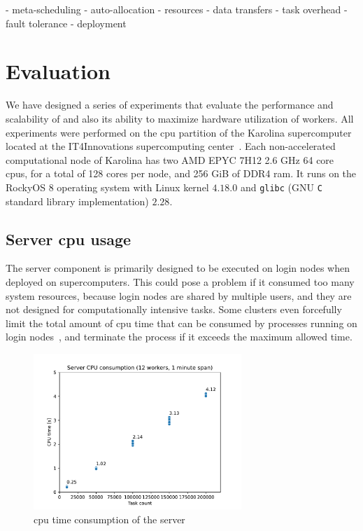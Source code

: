 - meta-scheduling
- auto-allocation
- resources
- data transfers
- task overhead
- fault tolerance
- deployment

\section{Evaluation}
We have designed a series of experiments that evaluate the performance and scalability of
\hyperqueue{} and also its ability to maximize hardware utilization of workers. All
experiments were performed on the \gls{cpu} partition of the Karolina
supercomputer~\cite{karolina} located at the IT4Innovations supercomputing
center~\cite{it4i}. Each non-accelerated computational node of Karolina has two AMD
EPYC\texttrademark{} 7H12 2.6 GHz 64 core \glspl{cpu}, for a total of 128 cores
per node, and 256 GiB of DDR4 \gls{ram}. It runs on the RockyOS 8 operating system
with Linux kernel $4.18.0$ and \texttt{glibc} (GNU \texttt{C} standard library implementation) $2.28$.


\subsection{Server \gls{cpu} usage}
\label{sec:hq-exp-server-cpu-usage}
The \hyperqueue{} server component is primarily designed to be executed on login nodes
when deployed on supercomputers. This could pose a problem if it consumed too many system
resources, because login nodes are shared by multiple users, and they are not designed for
computationally intensive tasks. Some clusters even forcefully limit the total amount of
\gls{cpu} time that can be consumed by processes running on login
nodes~\cite{leonardo_time_limit}, and terminate the process if it exceeds the maximum allowed time.

\begin{figure}[h]
	\centering
	\includegraphics[width=0.7\textwidth]{imgs/hq/charts/server-utilization-tasks}
	\caption{\gls{cpu} time consumption of the \hyperqueue{} server}
	\label{fig:hq-server-cpu-consumption}
\end{figure}

